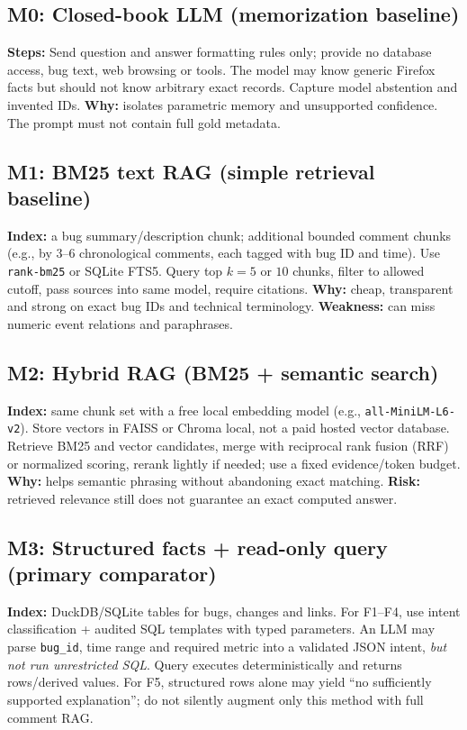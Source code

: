 \documentclass[11pt,a4paper]{article}
\begin{document}
\subsection{M0: Closed-book LLM (memorization baseline)}
\textbf{Steps:} Send question and answer formatting rules only; provide no database access, bug text, web browsing or tools. The model may know generic Firefox facts but should not know arbitrary exact records. Capture model abstention and invented IDs. \textbf{Why:} isolates parametric memory and unsupported confidence. The prompt must not contain full gold metadata.

\subsection{M1: BM25 text RAG (simple retrieval baseline)}
\textbf{Index:} a bug summary/description chunk; additional bounded comment chunks (e.g., by 3--6 chronological comments, each tagged with bug ID and time). Use \texttt{rank-bm25} or SQLite FTS5. Query top $k=5$ or $10$ chunks, filter to allowed cutoff, pass sources into same model, require citations. \textbf{Why:} cheap, transparent and strong on exact bug IDs and technical terminology. \textbf{Weakness:} can miss numeric event relations and paraphrases.

\subsection{M2: Hybrid RAG (BM25 + semantic search)}
\textbf{Index:} same chunk set with a free local embedding model (e.g., \texttt{all-MiniLM-L6-v2})\cite{minilm}. Store vectors in FAISS or Chroma local, not a paid hosted vector database. Retrieve BM25 and vector candidates, merge with reciprocal rank fusion (RRF) or normalized scoring, rerank lightly if needed; use a fixed evidence/token budget. \textbf{Why:} helps semantic phrasing without abandoning exact matching. \textbf{Risk:} retrieved relevance still does not guarantee an exact computed answer.

\subsection{M3: Structured facts + read-only query (primary comparator)}
\textbf{Index:} DuckDB/SQLite tables for bugs, changes and links. For F1--F4, use intent classification + audited SQL templates with typed parameters. An LLM may parse \texttt{bug\_id}, time range and required metric into a validated JSON intent, \emph{but not run unrestricted SQL}. Query executes deterministically and returns rows/derived values. For F5, structured rows alone may yield ``no sufficiently supported explanation''; do not silently augment only this method with full comment RAG.
\end{document}
